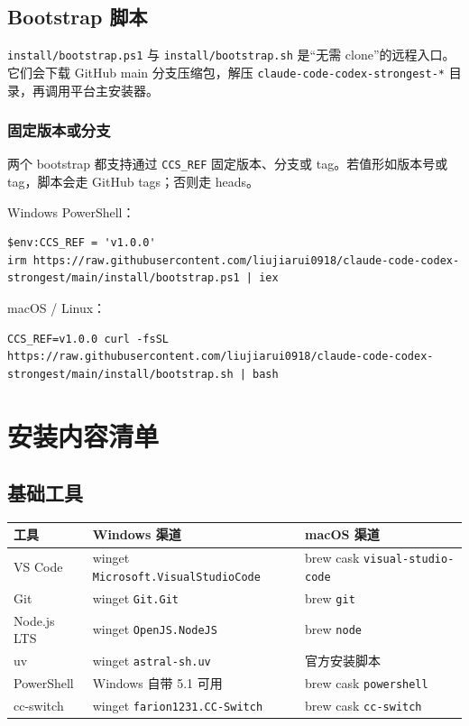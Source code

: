 \documentclass[11pt,a4paper]{ctexbook}
\begin{document}
\section{Bootstrap 脚本}

\texttt{install/bootstrap.ps1} 与 \texttt{install/bootstrap.sh} 是“无需 clone”的远程入口。它们会下载 GitHub main 分支压缩包，解压 \texttt{claude-code-codex-strongest-*} 目录，再调用平台主安装器。

\subsection{固定版本或分支}

两个 bootstrap 都支持通过 \texttt{CCS\_REF} 固定版本、分支或 tag。若值形如版本号或 tag，脚本会走 GitHub tags；否则走 heads。

Windows PowerShell：

\begin{lstlisting}[language={}]
$env:CCS_REF = 'v1.0.0'
irm https://raw.githubusercontent.com/liujiarui0918/claude-code-codex-strongest/main/install/bootstrap.ps1 | iex
\end{lstlisting}

macOS / Linux：

\begin{lstlisting}[language={}]
CCS_REF=v1.0.0 curl -fsSL https://raw.githubusercontent.com/liujiarui0918/claude-code-codex-strongest/main/install/bootstrap.sh | bash
\end{lstlisting}

\chapter{安装内容清单}

\section{基础工具}

\begin{longtable}{p{}p{}p{}}
\toprule
工具 & Windows 渠道 & macOS 渠道 \\
\midrule
VS Code & winget \texttt{Microsoft.VisualStudioCode} & brew cask \texttt{visual-studio-code} \\
Git & winget \texttt{Git.Git} & brew \texttt{git} \\
Node.js LTS & winget \texttt{OpenJS.NodeJS} & brew \texttt{node} \\
uv & winget \texttt{astral-sh.uv} & 官方安装脚本 \\
PowerShell & Windows 自带 5.1 可用 & brew cask \texttt{powershell} \\
cc-switch & winget \texttt{farion1231.CC-Switch} & brew cask \texttt{cc-switch} \\
\bottomrule
\end{longtable}
\end{document}
